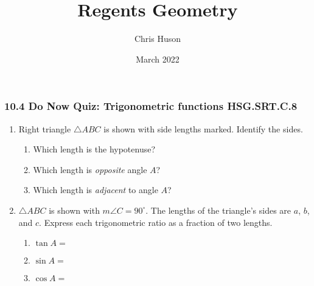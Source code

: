 \documentclass[12pt, twoside]{article}
\title{Regents Geometry}
\author{Chris Huson}
\date{March 2022}
\begin{document}
\subsubsection*{10.4 Do Now Quiz: Trigonometric functions \hfill HSG.SRT.C.8}
\begin{enumerate}
\item Right triangle $\triangle ABC$ is shown with side lengths marked. Identify the sides. \vspace{0.5cm}
\begin{multicols}{2}
  \begin{enumerate} [itemsep=1cm]
    \item Which length is the hypotenuse?
    \item Which length is \emph{opposite} angle $A$?
    \item Which length is \emph{adjacent} to angle $A$?
  \end{enumerate}
\begin{flushright}
\end{flushright}
\end{multicols}  \vspace{1cm}

\item $\triangle ABC$ is shown with $m\angle C=90^\circ$. The lengths of the triangle's sides are $a$, $b$, and $c$. Express each trigonometric ratio as a fraction of two lengths. \vspace{1cm}
\begin{multicols}{2}
      \begin{enumerate}
        \item $\tan A =$ \vspace{0.75cm}
        \item $\sin A =$ \vspace{0.75cm}
        \item $\cos A =$ \vspace{0.75cm}
    \end{enumerate}
\end{multicols} \vspace{0.5cm}


\end{enumerate}
\end{document}
